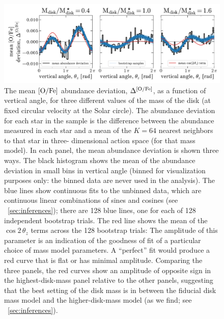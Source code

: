 \documentclass[modern]{aastex63}
\newcommand{\ofe}{\abunratio{O}{Fe}}
\begin{document}
\begin{figure}[!tp] %
  \begin{mdframed}
    \color{captiongray}
  \begin{center}
  \includegraphics[width=\textwidth]{sinusoid-fits.pdf}
  \end{center}
  \caption{%
    The mean $\ofe$ abundance deviation, $\Delta^\ofe$, as a
    function of vertical angle, for three different values of the mass of the
    disk (at fixed circular velocity at the Solar circle).
    The abundance deviation for each star in the sample is the difference
    between the abundance measured in each star and a mean of the $K=64$ nearest
    neighbors to that star in three- dimensional action space (for that mass
    model).
    In each panel, the mean abundance deviation is shown three ways.
    The black histogram shows the mean of the abundance deviation in small bins
    in vertical angle (binned for visualization purposes only: the binned data
    are never used in the analysis).
    The blue lines show continuous fits to the unbinned data, which are
    continuous linear combinations of sines and cosines (see
    \sectionname~\ref{sec:inferences}); there are 128 blue lines, one for each
    of 128 independent bootstrap trials.
    The red line shows the mean of the $\cos 2\,\theta_z$ terms across the 128
    bootstrap trials: The amplitude of this parameter is an indication of the
    goodness of fit of a particular choice of mass model parameters.
    A ``perfect'' fit would produce a red curve that is flat or has minimal
    amplitude.
    Comparing the three panels, the red curves show an amplitude of opposite
    sign in the highest-disk-mass panel relative to the other panels, suggesting
    that the best setting of the disk mass is in between the fiducial disk mass
    model and the higher-disk-mass model (as we find; see
    \sectionname~\ref{sec:inferences}).
  \label{fig:sinusoid-fits}
  }
  \end{mdframed}
\end{figure}
\end{document}
